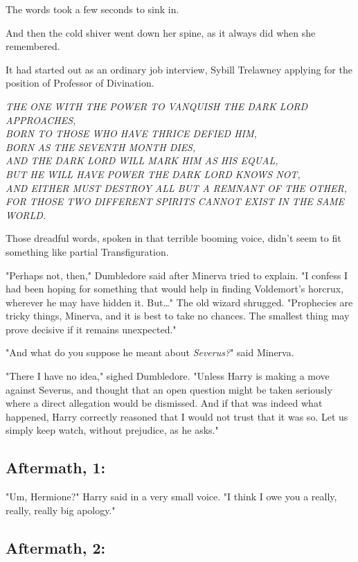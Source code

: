 The words took a few seconds to sink in.

And then the cold shiver went down her spine, as it always did when she 
remembered.

It had started out as an ordinary job interview, Sybill Trelawney applying for 
the position of Professor of Divination.

\emph{THE ONE WITH THE POWER TO VANQUISH THE DARK LORD APPROACHES,\\
BORN TO THOSE WHO HAVE THRICE DEFIED HIM,\\
BORN AS THE SEVENTH MONTH DIES,\\
AND THE DARK LORD WILL MARK HIM AS HIS EQUAL,\\
BUT HE WILL HAVE POWER THE DARK LORD KNOWS NOT,\\
AND EITHER MUST DESTROY ALL BUT A REMNANT OF THE OTHER,\\
FOR THOSE TWO DIFFERENT SPIRITS CANNOT EXIST IN THE SAME WORLD.}

Those dreadful words, spoken in that terrible booming voice, didn't seem to fit 
something like partial Transfiguration.

"Perhaps not, then," Dumbledore said after Minerva tried to explain. "I confess 
I had been hoping for something that would help in finding Voldemort's horcrux, 
wherever he may have hidden it. But{\ldots}" The old wizard shrugged. 
"Prophecies are tricky things, Minerva, and it is best to take no chances. The 
smallest thing may prove decisive if it remains unexpected."

"And what do you suppose he meant about \emph{Severus?}" said Minerva.

"There I have no idea," sighed Dumbledore. "Unless Harry is making a move 
against Severus, and thought that an open question might be taken seriously 
where a direct allegation would be dismissed. And if that was indeed what 
happened, Harry correctly reasoned that I would not trust that it was so. Let 
us simply keep watch, without prejudice, as he asks."
\sbreak
\subsection{Aftermath, 1:}

"Um, Hermione?" Harry said in a very small voice. "I think I owe you a really, 
really, really big apology."
\sbreak
\subsection{Aftermath, 2:}


